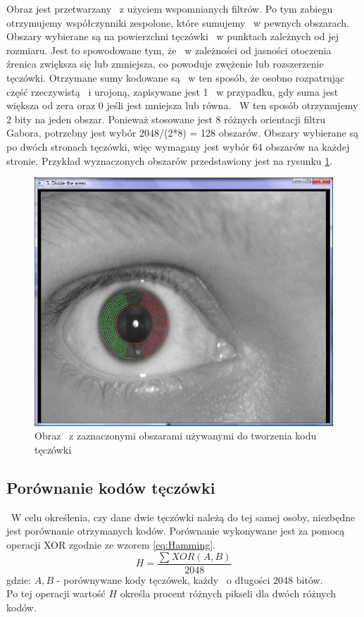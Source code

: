Obraz jest przetwarzany ~z użyciem wspomnianych filtrów. Po tym zabiegu otrzymujemy współczynniki zespolone, które sumujemy ~w pewnych obszarach. Obszary wybierane są na powierzchni tęczówki ~w punktach zależnych od jej rozmiaru. Jest to spowodowane tym, że ~w zależności od jasności otoczenia źrenica zwiększa się lub zmniejsza, co powoduje zwężenie lub rozszerzenie tęczówki. Otrzymane sumy kodowane są ~w ten sposób, że osobno rozpatrując część rzeczywistą ~i urojoną, zapisywane jest 1 ~w przypadku, gdy suma jest większa od zera oraz 0 jeśli jest mniejsza lub równa. ~W ten sposób otrzymujemy 2 bity na jeden obszar. Ponieważ stosowane jest 8 różnych orientacji filtru Gabora, potrzebny jest wybór 2048/(2*8) = 128 obszarów. Obszary wybierane są po dwóch stronach tęczówki, więc wymagany jest wybór 64 obszarów na każdej stronie. Przykład wyznaczonych obszarów przedstawiony jest na rysunku \ref{fig:obszaryNasze}.

\begin{figure}
\begin{center}
\includegraphics[scale=0.5]{obszary.jpg}
\caption{Obraz ~z zaznaczonymi obszarami używanymi do tworzenia kodu tęczówki}
\label{fig:obszaryNasze}
\end{center}
\end{figure}

\subsection{Porównanie kodów tęczówki}
\label{subsec:porownanieKodow}
~W celu określenia, czy dane dwie tęczówki należą do tej samej osoby, niezbędne jest porównanie otrzymanych kodów. Porównanie wykonywane jest za pomocą operacji XOR zgodnie ze wzorem \ref{eq:Hamming}.
\begin{equation}
\label{eq:Hamming}
H = \frac{\sum XOR(A,B)}{2048}
\end{equation}
gdzie:
$A, B$ - porównywane kody tęczówek, każdy ~o długości 2048 bitów.\\
Po tej operacji wartość $H$ określa procent różnych pikseli dla dwóch różnych kodów.

